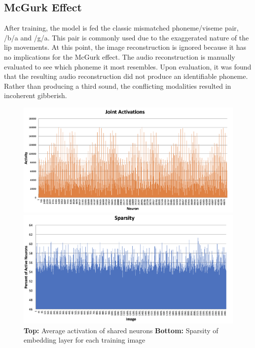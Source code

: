 \documentclass[conference]{IEEEtran}
\begin{document}
\subsection{McGurk Effect}
After training, the model is fed the classic mismatched phoneme/viseme pair, /b/a and /g/a. This pair is commonly used due to the exaggerated nature of the lip movements. At this point, the image reconstruction is ignored because it has no implications for the McGurk effect. The audio reconstruction is manually evaluated to see which phoneme it most resembles. Upon evaluation, it was found that the resulting audio reconstruction did not produce an identifiable phoneme. Rather than producing a third sound, the conflicting modalities resulted in incoherent gibberish.

\begin{figure}[!t]
\centering
\includegraphics[scale=0.4]{sharedgraph}

\vspace{0.5cm}

\includegraphics[scale=0.4]{sparsegraph}
\caption{\textbf{Top:} Average activation of shared neurons \textbf{Bottom:} Sparsity of embedding layer for each training image}
\label{graph:shared}
\end{figure}
\end{document}
